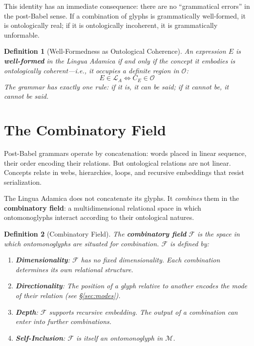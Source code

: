 \documentclass[12pt, letterpaper]{book}
\newtheorem{definition}{Definition}[chapter]
\begin{document}
This identity has an immediate consequence: there are no ``grammatical errors'' in the post-Babel sense. If a combination of glyphs is grammatically well-formed, it is ontologically real; if it is ontologically incoherent, it is grammatically unformable.

\begin{definition}[Well-Formedness as Ontological Coherence]
An expression $E$ is \textbf{well-formed} in the Lingua Adamica if and only if the concept it embodies is ontologically coherent---i.e., it occupies a definite region in $\mathcal{O}$:
\[
E \in \mathcal{L}_A \iff C_E \in \mathcal{O}
\]
The grammar has exactly one rule: \textit{if it is, it can be said; if it cannot be, it cannot be said}.
\end{definition}


\section{The Combinatory Field}

Post-Babel grammars operate by concatenation: words placed in linear sequence, their order encoding their relations. But ontological relations are not linear. Concepts relate in webs, hierarchies, loops, and recursive embeddings that resist serialization.

The Lingua Adamica does not concatenate its glyphs. It \textit{combines} them in the \textbf{combinatory field}: a multidimensional relational space in which ontomonoglyphs interact according to their ontological natures.

\begin{definition}[Combinatory Field]
The \textbf{combinatory field} $\mathcal{F}$ is the space in which ontomonoglyphs are situated for combination. $\mathcal{F}$ is defined by:
\begin{enumerate}[label=(\roman*)]
    \item \textbf{Dimensionality}: $\mathcal{F}$ has no fixed dimensionality. Each combination determines its own relational structure.
    \item \textbf{Directionality}: The position of a glyph relative to another encodes the \textit{mode} of their relation (see \S\ref{sec:modes}).
    \item \textbf{Depth}: $\mathcal{F}$ supports recursive embedding. The output of a combination can enter into further combinations.
    \item \textbf{Self-Inclusion}: $\mathcal{F}$ is itself an ontomonoglyph in $\mathcal{M}$.
\end{enumerate}
\end{definition}
\end{document}

